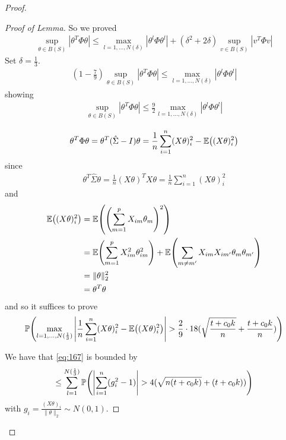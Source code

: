 \begin{proof}
\begin{proof}[Proof of Lemma]
    So we proved
    \begin{align}
      \label{eq:161}
      \sup_{\theta \in B(S)} | \theta^{T} \Phi \theta| \leq \max_{l =
        1, \dots, N(\delta)} |\theta^{l} \Phi \theta^{l}| +
      (\delta^{2} + 2 \delta) \sup_{v \in B(S)} |v^{T} \Phi v|
    \end{align}
    Set $\delta = \frac{1}{3}$.
    \begin{align}
      \label{eq:162}
      (1 - \frac{7}{9}) \sup_{\theta \in B(S)} | \theta^{T} \Phi
      \theta | \leq \max_{l = 1, \dots, N(\delta)} | \theta^{l} \Phi
      \theta^{l} |
    \end{align}
    showing
    \begin{align}
      \label{eq:163}
      \sup_{\theta \in B(S)} | \theta^{T} \Phi \theta | \leq
      \frac{9}{2} \max_{l = 1, \dots, N(\delta)} | \theta^{l} \Phi
      \theta^{l} |
    \end{align}

    \begin{align}
      \label{eq:164}
      \theta^{T} \Phi \theta = \theta^{T} (\hat \Sigma - I) \theta =
      \frac{1}{n} \sum_{i=1}^{n} (X \theta)_{i}^{2} - \E{(X \theta)_{i}^{2}}
    \end{align} since
    \begin{align}
      \label{eq:165}
      \theta^{T} \hat \Sigma \theta = \frac{1}{n} (X \theta)^{T} X
      \theta = \frac{1}{n} \sum_{i=1}^{n} (X \theta)_{i}^{2}
    \end{align} and
    \begin{align}
      \label{eq:166}
      \E{(X \theta)_{i}^{2}} &= \E{\left(\sum_{m=1}^{p} X_{im}
          \theta_{m} \right)^{2}} \\
      &= \E{\sum_{m=1}^{p} X_{im}^{2} \theta_{im}^{2}}  + \E{\sum_{m
          \neq m'} X_{im} X_{im'} \theta_{m} \theta_{m'}} \\
      &= \| \theta \|_{2}^{2} \\
      &= \theta^{T} \theta
    \end{align} and so it suffices to prove
    \begin{align}
      \label{eq:167}
      \Prob{\max_{l=1, \dots, N(\frac{1}{3})} \left| \frac{1}{n}
          \sum_{i=1}^{n} (X \theta)_{i}^{2} - \E{(X \theta)_{i}^{2}}
        \right| > \frac{2}{9} \cdot 18  (\sqrt{\frac{t + c_{0} k}{n}}
        + \frac{t + c_{0} k}{n})}
    \end{align}


    We have that \eqref{eq:167} is bounded by
    \begin{align}
      \label{eq:136}
      \leq \sum_{l=1}^{N(\frac{1}{3})} \Prob{\left| \sum_{i=1}^{n}
          (g_{i}^{2}  - 1) \right| > 4 (\sqrt{n(t + c_{0} k)} + (t + c_{0}k))}
    \end{align} with $g_{i} = \frac{(X \theta)_{i}}{\| \theta \|_{2}}
    \sim N(0, 1)$.


\end{proof}
\end{proof}
